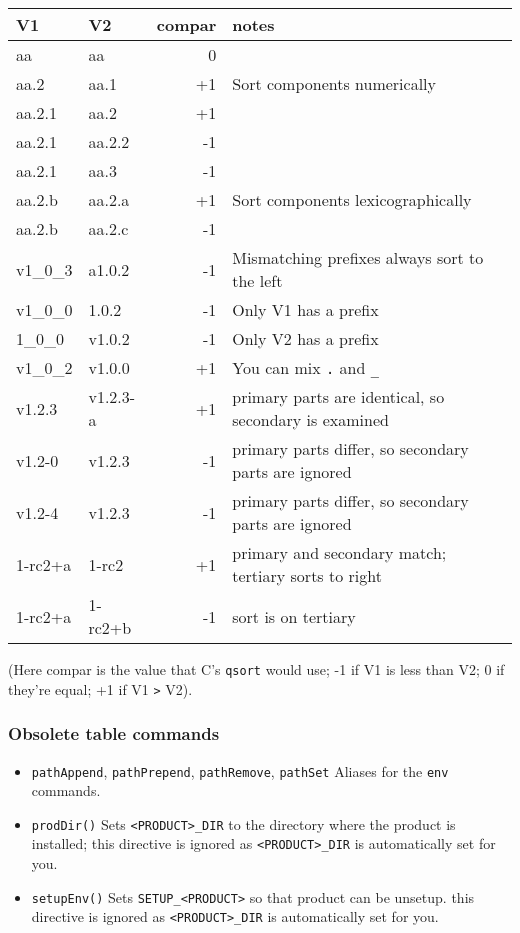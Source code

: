\documentclass{article}
\newcommand{\code}[1]{\texttt{#1}}
\begin{document}
\begin{tabular}{l|l|r|l}%
V1 & V2 & compar & notes \\
\hline
aa & aa & 0 & \\
aa.2 & aa.1 & +1 & Sort components numerically \\
aa.2.1 & aa.2 & +1 & \\
aa.2.1 & aa.2.2 & -1 & \\
aa.2.1 & aa.3 & -1 & \\
aa.2.b & aa.2.a & +1 & Sort components lexicographically \\
aa.2.b & aa.2.c & -1 & \\
v1\_0\_3 & a1.0.2 & -1 & Mismatching prefixes always sort to the left \\
v1\_0\_0 & 1.0.2 & -1 & Only V1 has a prefix \\
1\_0\_0 & v1.0.2 & -1 & Only V2 has a prefix\\
v1\_0\_2 & v1.0.0 & +1 & You can mix \code{.} and \code{\_} \\
v1.2.3 & v1.2.3-a & +1 & primary parts are identical, so secondary is examined \\
v1.2-0 & v1.2.3 & -1 & primary parts differ, so secondary parts are ignored \\
v1.2-4 & v1.2.3 & -1 & primary parts differ, so secondary parts are ignored \\
1-rc2+a & 1-rc2 & +1 & primary and secondary match; tertiary sorts to right \\
1-rc2+a & 1-rc2+b & -1 & sort is on tertiary \\
\end{tabular}

(Here compar is the value that C's \code{qsort} would use;  -1 if V1 is less
than V2; 0 if they're equal; +1 if V1 \code{>} V2).

\subsubsection{Obsolete table commands}

\begin{itemize}
   \item \code{pathAppend}, \code{pathPrepend}, \code{pathRemove}, \code{pathSet}
     Aliases for the \code{env} commands.
     
   \item \code{prodDir()}
     Sets \code{<PRODUCT>\_DIR} to the directory where the product is installed;
     this directive is ignored as \code{<PRODUCT>\_DIR} is automatically set for you.
     
   \item \code{setupEnv()}
     Sets \code{SETUP\_<PRODUCT>} so that product can be unsetup.
     this directive is ignored as \code{<PRODUCT>\_DIR} is automatically set for you.
\end{itemize}
        
\end{document}
